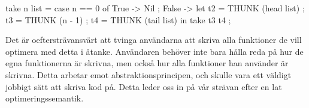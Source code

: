 \documentclass[../Optimise]{subfiles}
\begin{document}
\begin{codeEx}
take n list = case n == 0 of
    { True -> Nil
    ; False -> let 
        { t2 = THUNK (head list)
        ; t3 = THUNK (n - 1)
        ; t4 = THUNK (tail list)
        } in  take t3 t4
    };
\end{codeEx}


Det är oeftersträvansvärt att tvinga användarna att skriva alla funktioner
de vill optimera med detta i åtanke. Användaren behöver inte bara hålla reda på 
hur de egna funktionerna är skrivna, men också hur alla funktioner han använder är skrivna. 
Detta arbetar emot abstraktionsprincipen, och skulle vara ett väldigt jobbigt
sätt att skriva kod på. 
Detta leder oss in på vår strävan efter en lat optimeringssemantik.
\end{document}
